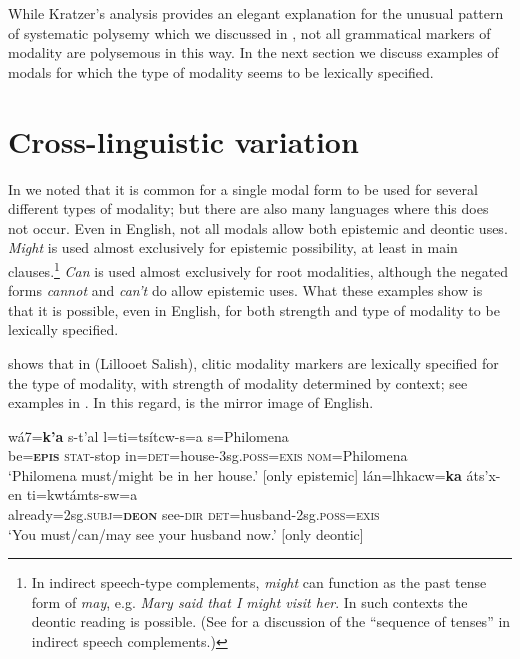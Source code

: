 While Kratzer’s analysis provides an elegant explanation for the unusual pattern of systematic polysemy which we discussed in , not all grammatical markers of modality are polysemous in this way. In the next section we discuss examples of modals for which the type of modality seems to be lexically specified.


\section{Cross-linguistic variation}\label{sec:16.4}

In  we noted that it is common for a single modal form to be used for several different types of modality; but there are also many languages where this does not occur. Even in English, not all modals allow both epistemic and deontic uses. \textit{Might} is used almost exclusively for epistemic possibility, at least in main clauses.\footnote{In indirect speech-type complements, \textit{might} can function as the past tense form of \textit{may}, e.g. \textit{Mary said that I might visit her}. In such contexts the deontic reading is possible. (See  for a discussion of the “sequence of tenses” in indirect speech complements.)} \textit{Can} is used almost exclusively for root modalities, although the negated forms \textit{cannot} and \textit{can’t} do allow epistemic uses. What these examples show is that it is possible, even in English, for both strength and type of modality to be lexically specified.



\citet{Matthewson2010} shows that in  (Lillooet Salish), clitic modality markers are lexically specified for the type of modality, with strength of modality determined by context; see examples in . In this regard,  is the mirror image of English.


\ea \label{ex:16.25}
\ea   \gll wá7=\textbf{k’a}  s-t’al  l=ti=tsítcw-s=a  s=Philomena\\
be=\textbf{\textsc{epis}}  \textsc{stat}-stop  in=\textsc{det}=house-3sg.\textsc{poss}=\textsc{exis}  \textsc{nom}=Philomena\\
\glt ‘Philomena must/might be in her house.’ \hfill  [only epistemic]
\ex \gll lán=lhkacw=\textbf{ka}  áts’x-en  ti=kwtámts-sw=a\\
already=2sg.\textsc{subj}=\textbf{\textsc{deon}}  see-\textsc{dir}  \textsc{det}=husband-2sg.\textsc{poss}=\textsc{exis}\\
\glt ‘You must/can/may see your husband now.’ \hfill  [only deontic]
\z \z



